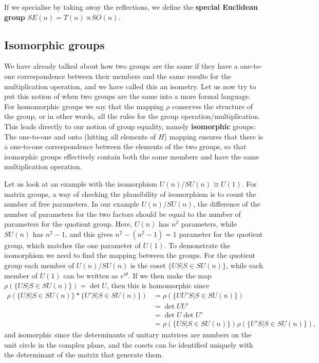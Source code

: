 \documentclass[notes.tex]{subfiles}
\begin{document}
If we specialise by taking away the reflections, we define the {\bf special Euclidean group} $SE(n)= T(n)\rtimes SO(n)$.  


\subsection{Isomorphic groups}
We have already talked about how two groups are the same if they have a one-to-one correspondence between their members and the same results for the multiplication operation, and we have called this an isometry. Let us now try to put this notion of when two groups are the same into a more formal language.
For homomorphic groups we say that the mapping $\rho$ conserves the structure of the group, or in other words, all the rules for the group operation/multiplication. This leads directly to our notion of group equality, namely {\bf isomorphic} groups:
The one-to-one and onto (hitting all elements of $H$) mapping ensures that there is a one-to-one correspondence between the elements of the two groups, so that isomorphic groups effectively contain both the same members and have the same multiplication operation.

Let us look at an example with the isomorphism $U(n)/SU(n)\cong U(1)$. For matrix groups, a way of checking the plausibility of isomorphism is to count the number of free parameters.  In our example $U(n)/SU(n)$, the difference of the number of parameters for the two factors should be equal to the number of parameters for the quotient group. Here, $U(n)$ has $n^2$ parameters, while $SU(n)$ has $n^2-1$, and this gives $n^2-(n^2-1)=1$ parameter for the quotient group, which matches the one parameter of $U(1)$. To demonstrate the isomorphism we need to find the mapping between the groups. For the quotient group each member of $U(n)/SU(n)$ is the coset $\{US|S\in SU(n)\}$, while each member of $U(1)$ can be written as $e^{i\theta}$. If we then make the map $\rho(\{US|S\in SU(n)\})=\det U$, then this is homomorphic since
\begin{align*}
\rho(\{US|S\in SU(n)\}*\{U'S| S\in SU(n)\}) &= \rho( \{ UU'S| S\in SU(n)\} ) \\ 
& = \det UU'  \\
&= \det U \det U' \\
&= \rho(\{US|S\in SU(n)\})\rho(\{U'S| S\in SU(n)\}),
\end{align*}
and isomorphic since the determinants of unitary matrices are numbers on the unit circle in the complex plane, and the cosets can be identified uniquely with the determinant of the matrix that generate them.
\end{document}
